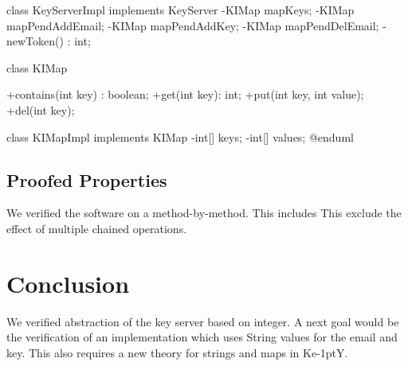 \documentclass{llncs}
\newcommand{\KeY}{Ke\kern-1ptY\xspace}
\begin{document}
class KeyServerImpl implements KeyServer {
    -KIMap mapKeys;
    -KIMap mapPendAddEmail;
    -KIMap mapPendAddKey;
    -KIMap mapPendDelEmail;
    -newToken() : int;
}

class KIMap {
    +contains(int key) : boolean;
    +get(int key): int;
    +put(int key, int value);
    +del(int key);

}

class KIMapImpl implements KIMap {
    -int[] keys;
    -int[] values;
}
@enduml
\fi

\subsection*{Proofed Properties}

We verified the software on a method-by-method.
%
This includes
%
This exclude the effect of multiple chained operations. 

\section{Conclusion }

We verified abstraction of the key server based on integer.
%
A next goal would be the verification of an implementation which uses String
values for the email and key. This also requires a new theory for strings and
maps in \KeY.
%
%
\end{document}
